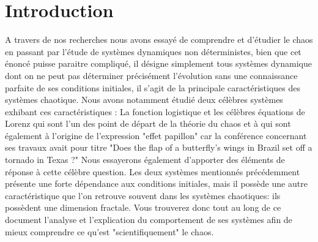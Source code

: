 \chapter{Introduction}
A travers de nos recherches nous avons essayé de comprendre et d'étudier
le chaos en passant par l'étude de systèmes dynamiques non déterministes, bien que cet énoncé 
puisse paraitre compliqué, il désigne simplement tous systèmes dynamique dont on ne peut pas déterminer 
précisément l'évolution sans une connaissance parfaite de ses conditions initiales, il s'agit de la
principale caractéristiques des systèmes chaotique. Nous avons notamment étudié deux célèbres systèmes
exhibant ces caractéristiques : La fonction logistique et les célèbres équations de Lorenz qui sont l'un des
point de départ de la théorie du chaos et à qui sont également à l'origine de l'expression "effet papillon" 
car la conférence concernant ses travaux avait pour titre "Does the flap of a butterfly’s wings in Brazil set off a tornado in Texas ?"
Nous essayerons également d’apporter des éléments de réponse à cette célèbre question.
Les deux systèmes mentionnés précédemment présente une forte dépendance aux conditions initiales, mais il possède une autre 
caractéristique que l'on retrouve souvent dans les systèmes chaotiques: ils possèdent une dimension fractale.
Vous trouverez donc tout au long de ce document l'analyse et l'explication du comportement de ses systèmes afin de mieux comprendre
ce qu'est "scientifiquement" le chaos.
  
